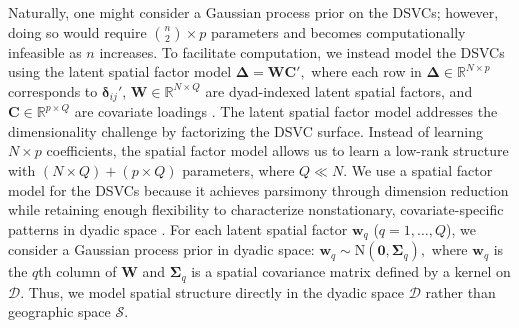 \documentclass{article}
\begin{document}
Naturally, one might consider a Gaussian process prior on the DSVCs; however, doing so would require ${n \choose 2}\times p$ parameters and becomes computationally infeasible as $n$ increases. 
To facilitate computation, we instead model the DSVCs using the latent spatial factor model
$\boldsymbol\Delta=\mathbf{WC}',$
where each row in $\boldsymbol\Delta\in\mathbb{R}^{N\times p}$ corresponds to $\boldsymbol\delta_{ij}'$, $\mathbf{W}\in\mathbb{R}^{N\times Q}$ are dyad-indexed latent spatial factors, and $\mathbf{C}\in\mathbb{R}^{p\times Q}$ are covariate loadings \citep{zhang2022spatial,doser2025modeling}. 
The latent spatial factor model addresses the dimensionality challenge by factorizing the DSVC surface. Instead of learning $N \times p$ coefficients, the spatial factor model allows us to learn a low-rank structure with $(N\times Q)+(p\times Q)$ parameters, where $Q\ll N$. 
We use a spatial factor model for the DSVCs because it achieves parsimony through dimension reduction while retaining enough flexibility to characterize nonstationary, covariate-specific patterns in dyadic space \citep{taylor2019spatial}.
For each latent spatial factor $\mathbf{w}_q$ ($q=1,\dots,Q$), we consider a Gaussian process prior in dyadic space:
$\mathbf{w}_q \sim \text{N}(\boldsymbol0,\boldsymbol{\Sigma}_q),$
where $\mathbf{w}_q$ is the $q$th column of $\mathbf{W}$ and $\boldsymbol{\Sigma}_q$ is a spatial covariance matrix defined by a kernel on $\mathcal{D}$. 
Thus, we model spatial structure directly in the dyadic space $\mathcal{D}$ rather than geographic space $\mathcal{S}$.
\end{document}
